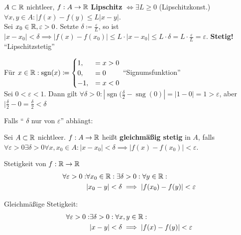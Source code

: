 \begin{subexample}
	$ A\subset \mathbb{R}  $ nichtleer, $ f: A \to \mathbb{R}  $ \textbf{Lipschitz} $ \iff \exists L \geq  0 $ (Lipschitzkonst.) $ \forall x, y \in A: | f(x) - f(y) \leq  L|x - y| $.\\
	Sei $ x_0 \in \mathbb{R} , \varepsilon > 0 $. Setzte $ \delta \coloneqq \frac{ \varepsilon  }{ L }  $, so ist $ | x - x_0 | < \delta \implies |f(x) - f(x_0)| \leq L \cdot | x - x_0 | \leq  L \cdot \delta = L \cdot \frac{ \varepsilon  }{ L } = \varepsilon $. \textbf{Stetig!} ``Lipschitzstetig''
\end{subexample}

\begin{subexample}
	Für $ x \in \mathbb{R} : \operatorname{sgn}(x) \coloneqq \begin{cases}
		1, &= x > 0 \\
		0, &= 0 \\
		-1, &= x < 0 \\
	\end{cases} $ ``Signumsfunktion''\\
	Sei $ 0 < \varepsilon < 1 $. Dann gilt $ \forall \delta > 0: | \operatorname{sgn}(\frac{ \delta }{ 2 } - \operatorname{sng}(0) | = | 1 - 0 | = 1 > \varepsilon  $, aber $ | \frac{ \delta }{ 2 } - 0 = \frac{ \delta }{ 2 } < \delta $\\
\end{subexample}
Falls `` $ \delta $ nur von $ \varepsilon  $'' abhängt:
\begin{subdefinition}
	Sei $ A \subset \mathbb{R}  $ nichtleer. $ f: A \to \mathbb{R}  $ heißt \textbf{gleichmäßig stetig} in $ A $, falls\\
	$ \forall \varepsilon > 0\exists \delta > 0 \forall x, x_0 \in A : | x - x_0 | < \delta \implies  |f(x) - f(x_0) | < \varepsilon  $.
\end{subdefinition}


Stetigkeit von $ f: \mathbb{R}  \to \mathbb{R}  $ 
\begin{align*}
	\forall \varepsilon > 0 : &\forall x_0 \in \mathbb{R} : \exists \delta > 0 : \forall y \in \mathbb{R} :\\
	~& | x_0 - y | < \delta \implies |f(x_0) - f(y) | < \varepsilon 
\end{align*}

Gleichmäßige Stetigkeit:
\begin{align*}
	\forall \varepsilon > 0: &\exists \delta > 0 :\forall x, y \in \mathbb{R} :\\
	~&| x - y | < \delta \implies | f(x) - f(y) | < \varepsilon 
\end{align*}

